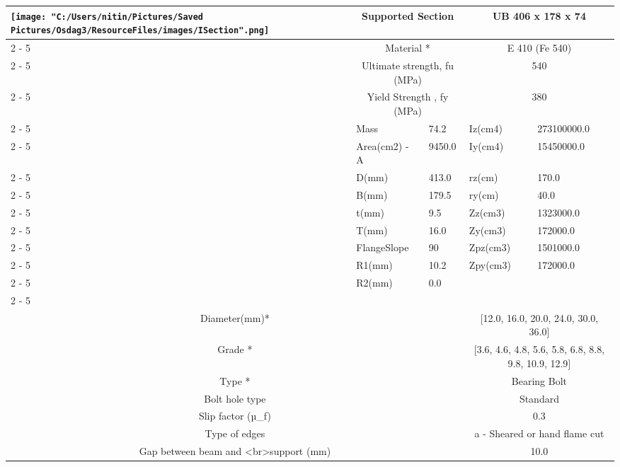 \documentclass{article}%
\begin{document}
\begin{longtable}{|p{5cm}|p{2cm}|p{2cm}|p{2cm}|p{5cm}|}
\hline%
\hline%
\multirow{13}{*}{\texttt{[image: "C:/Users/nitin/Pictures/Saved Pictures/Osdag3/ResourceFiles/images/ISection".png]}}&\multicolumn{2}{|c|}{Supported Section}&\multicolumn{2}{|c|}{UB 406 x 178 x 74}\\%
\cline{2%
-%
5}%
&\multicolumn{2}{|c|}{Material *}&\multicolumn{2}{|c|}{E 410 (Fe 540)}\\%
\cline{2%
-%
5}%
&\multicolumn{2}{|c|}{Ultimate strength, fu (MPa)}&\multicolumn{2}{|c|}{540}\\%
\cline{2%
-%
5}%
&\multicolumn{2}{|c|}{Yield Strength , fy (MPa)}&\multicolumn{2}{|c|}{380}\\%
\cline{2%
-%
5}%
&Mass&74.2&Iz(cm4)&273100000.0\\%
\cline{2%
-%
5}%
&Area(cm2) {-} A&9450.0&Iy(cm4)&15450000.0\\%
\cline{2%
-%
5}%
&D(mm)&413.0&rz(cm)&170.0\\%
\cline{2%
-%
5}%
&B(mm)&179.5&ry(cm)&40.0\\%
\cline{2%
-%
5}%
&t(mm)&9.5&Zz(cm3)&1323000.0\\%
\cline{2%
-%
5}%
&T(mm)&16.0&Zy(cm3)&172000.0\\%
\cline{2%
-%
5}%
&FlangeSlope&90&Zpz(cm3)&1501000.0\\%
\cline{2%
-%
5}%
&R1(mm)&10.2&Zpy(cm3)&172000.0\\%
\cline{2%
-%
5}%
&R2(mm)&0.0&&\\%
\cline{2%
-%
5}%
\hline%
\multicolumn{5}{|c|}{\textbf{Bolt Details}}\\%
\hline%
\hline%
\multicolumn{3}{|c|}{Diameter(mm)*}&\multicolumn{2}{|c|}{{[}12.0, 16.0, 20.0, 24.0, 30.0, 36.0{]}}\\%
\hline%
\hline%
\multicolumn{3}{|c|}{Grade *}&\multicolumn{2}{|c|}{{[}3.6, 4.6, 4.8, 5.6, 5.8, 6.8, 8.8, 9.8, 10.9, 12.9{]}}\\%
\hline%
\hline%
\multicolumn{3}{|c|}{Type *}&\multicolumn{2}{|c|}{Bearing Bolt}\\%
\hline%
\hline%
\multicolumn{3}{|c|}{Bolt hole type}&\multicolumn{2}{|c|}{Standard}\\%
\hline%
\hline%
\multicolumn{3}{|c|}{Slip factor (µ\_f)}&\multicolumn{2}{|c|}{0.3}\\%
\hline%
\hline%
\multicolumn{3}{|c|}{Type of edges}&\multicolumn{2}{|c|}{a {-} Sheared or hand flame cut}\\%
\hline%
\hline%
\multicolumn{3}{|c|}{Gap between beam and <br>support (mm)}&\multicolumn{2}{|c|}{10.0}\\%
\hline%

\end{longtable}
\end{document}

